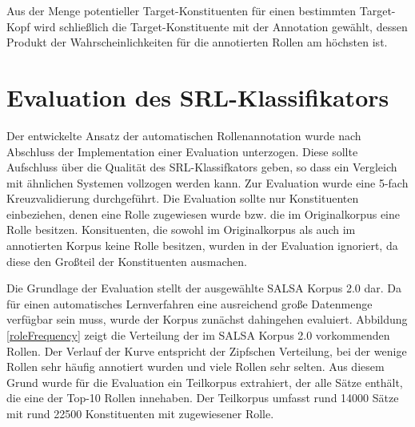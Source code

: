 \documentclass[12pt]{article}
\begin{document}
Aus der Menge potentieller Target-Konstituenten für einen bestimmten Target-Kopf wird schließlich die Target-Konstituente mit der Annotation gewählt, dessen Produkt der Wahrscheinlichkeiten für die annotierten Rollen am höchsten ist.

\begin{center}
\end{center}

\newpage
\section{Evaluation des SRL-Klassifikators}

Der entwickelte Ansatz der automatischen Rollenannotation wurde nach Abschluss
der Implementation einer Evaluation unterzogen. Diese sollte Aufschluss über die
Qualität des SRL-Klassifkators geben, so dass ein Vergleich mit ähnlichen
Systemen vollzogen werden kann. Zur Evaluation wurde eine 5-fach Kreuzvalidierung durchgeführt. Die Evaluation sollte nur Konstituenten einbeziehen, denen eine Rolle zugewiesen wurde bzw. die im Originalkorpus eine Rolle besitzen. Konsituenten, die sowohl im Originalkorpus als auch im annotierten Korpus keine Rolle besitzen, wurden in der Evaluation ignoriert, da diese den Großteil der Konstituenten ausmachen.

Die Grundlage der Evaluation stellt der ausgewählte SALSA Korpus 2.0 dar. Da für einen automatisches Lernverfahren eine ausreichend große Datenmenge verfügbar sein muss, wurde der Korpus zunächst dahingehen evaluiert. Abbildung \ref{roleFrequency} zeigt die Verteilung der im SALSA Korpus 2.0 vorkommenden Rollen. Der Verlauf der Kurve entspricht der Zipfschen Verteilung, bei der wenige Rollen sehr häufig annotiert wurden und viele Rollen sehr selten. Aus diesem Grund wurde für die Evaluation ein Teilkorpus extrahiert, der alle Sätze enthält, die eine der Top-10 Rollen innehaben. Der Teilkorpus umfasst rund 14000 Sätze mit rund 22500 Konstituenten mit zugewiesener Rolle.
\end{document}

